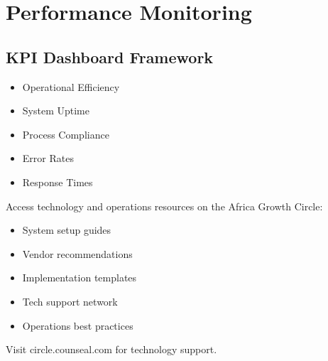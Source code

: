 \section{Performance Monitoring}

\subsection{KPI Dashboard Framework}
\begin{tcolorbox}[colback=white,colframe=primarydark,title=\textbf{Key Performance Indicators}]
\begin{itemize}
    \item Operational Efficiency
    \item System Uptime
    \item Process Compliance
    \item Error Rates
    \item Response Times
\end{itemize}
\end{tcolorbox}

\begin{communitybox}
Access technology and operations resources on the Africa Growth Circle:
\begin{itemize}
    \item System setup guides
    \item Vendor recommendations
    \item Implementation templates
    \item Tech support network
    \item Operations best practices
\end{itemize}
Visit circle.counseal.com for technology support.
\end{communitybox}

